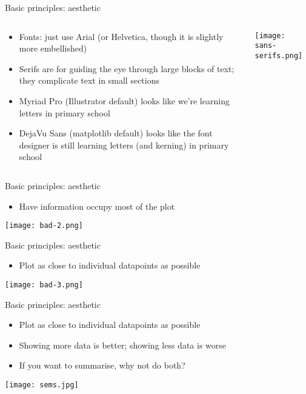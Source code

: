 \documentclass[10pt]{beamer}
\begin{document}
\begin{frame}{Basic principles: aesthetic}
  \begin{columns}
    \begin{column}{0.6\textwidth}
    \begin{itemize}
    \item Fonts: just use Arial (or Helvetica, though it is slightly more embellished)
    \item Serifs are for guiding the eye through large blocks of text; they complicate text in small sections
    \item Myriad Pro (Illustrator default) looks like we're learning letters in primary school
      \item DejaVu Sans (matplotlib default) looks like the font designer is still learning letters (and kerning) in primary school
    \end{itemize}
    \end{column}
    \begin{column}{0.6\textwidth}
      \texttt{[image: sans-serifs.png]}
    \end{column}
    \end{columns}
\end{frame}

\begin{frame}{Basic principles: aesthetic}
    \begin{itemize}
    \item Have information occupy most of the plot
    \end{itemize}
    \texttt{[image: bad-2.png]}
\end{frame}

\begin{frame}{Basic principles: aesthetic}
    \begin{itemize}
    \item Plot as close to individual datapoints as possible
    \end{itemize}
    \texttt{[image: bad-3.png]}
\end{frame}
\begin{frame}{Basic principles: aesthetic}
    \begin{itemize}
    \item Plot as close to individual datapoints as possible
    \item Showing more data is better; showing less data is worse
  \item If you want to summarise, why not do both?
    \end{itemize}
 \centering
    \texttt{[image: sems.jpg]}
 
\end{frame}
\end{document}

